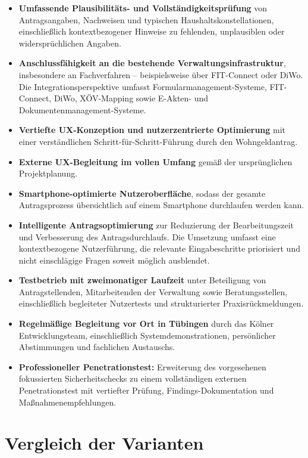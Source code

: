 \documentclass[11pt,a4paper,openany]{report}
\begin{document}
\begin{itemize}
  \item \textbf{Umfassende Plausibilitäts- und Vollständigkeitsprüfung} von Antragsangaben, Nachweisen und typischen Haushaltskonstellationen, einschließlich kontextbezogener Hinweise zu fehlenden, unplausiblen oder widersprüchlichen Angaben.
  \item \textbf{Anschlussfähigkeit an die bestehende Verwaltungsinfrastruktur}, insbesondere an Fachverfahren -- beispielsweise über FIT-Connect oder DiWo. Die Integrationsperspektive umfasst Formularmanagement-Systeme, FIT-Connect, DiWo, XÖV-Mapping sowie E-Akten- und Dokumentenmanagement-Systeme.
  \item \textbf{Vertiefte UX-Konzeption und nutzerzentrierte Optimierung} mit einer verständlichen Schritt-für-Schritt-Führung durch den Wohngeldantrag.
  \item \textbf{Externe UX-Begleitung im vollen Umfang} gemäß der ursprünglichen Projektplanung.
  \item \textbf{Smartphone-optimierte Nutzeroberfläche}, sodass der gesamte Antragsprozess übersichtlich auf einem Smartphone durchlaufen werden kann.
  \item \textbf{Intelligente Antragsoptimierung} zur Reduzierung der Bearbeitungszeit und Verbesserung des Antragsdurchlaufs. Die Umsetzung umfasst eine kontextbezogene Nutzerführung, die relevante Eingabeschritte priorisiert und nicht einschlägige Fragen soweit möglich ausblendet.
  \item \textbf{Testbetrieb mit zweimonatiger Laufzeit} unter Beteiligung von Antragstellenden, Mitarbeitenden der Verwaltung sowie Beratungsstellen, einschließlich begleiteter Nutzertests und strukturierter Praxisrückmeldungen.
  \item \textbf{Regelmäßige Begleitung vor Ort in Tübingen} durch das Kölner Entwicklungsteam, einschließlich Systemdemonstrationen, persönlicher Abstimmungen und fachlichen Austauschs.
  \item \textbf{Professioneller Penetrationstest:} Erweiterung des vorgesehenen fokussierten Sicherheitschecks zu einem vollständigen externen Penetrationstest mit vertiefter Prüfung, Findings-Dokumentation und Maßnahmenempfehlungen.
\end{itemize}

\section{Vergleich der Varianten}
\end{document}
